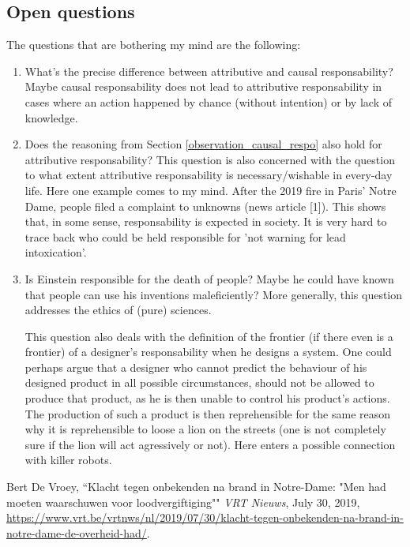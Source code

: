 \documentclass[../main/main.tex]{subfiles}
\begin{document}
\subsection{Open questions}
The questions that are bothering my mind are the following:
\begin{enumerate}
\item What's the precise difference between attributive and causal responsability? Maybe causal responsability does not lead to attributive responsability in cases where an action happened by chance (without intention) or by lack of knowledge. 

\item Does the reasoning from Section \ref{observation_causal_respo} also hold for attributive responsability? This question is also concerned with the question to what extent attributive responsability is necessary/wishable in every-day life. Here one example comes to my mind. After the 2019 fire in Paris' Notre Dame, people filed a complaint to unknowns (news article [1]). This shows that, in some sense, responsability is expected in society. It is very hard to trace back who could be held responsible for 'not warning for lead intoxication'.

\item Is Einstein responsible for the death of people? Maybe he could have known that people can use his inventions maleficiently? More generally, this question addresses the ethics of (pure) sciences. 

This question also deals with the definition of the frontier (if there even is a frontier) of a designer's responsability when he designs a system. One could perhaps argue that a designer who cannot predict the behaviour of his designed product in all possible circumstances, should not be allowed to produce that product, as he is then unable to control his product's actions. The production of such a product is then reprehensible for the same reason why it is reprehensible to loose a lion on the streets (one is not completely sure if the lion will act agressively or not). Here enters a possible connection with killer robots. 
\end{enumerate}


\vfill
\begin{thebibliography}{100}  
 Bert De Vroey, ``Klacht tegen onbekenden na brand in Notre-Dame: "Men had moeten waarschuwen voor loodvergiftiging"" \emph{VRT Nieuws}, July 30, 2019, \url{https://www.vrt.be/vrtnws/nl/2019/07/30/klacht-tegen-onbekenden-na-brand-in-notre-dame-de-overheid-had/}.
\end{thebibliography}
\end{document}
